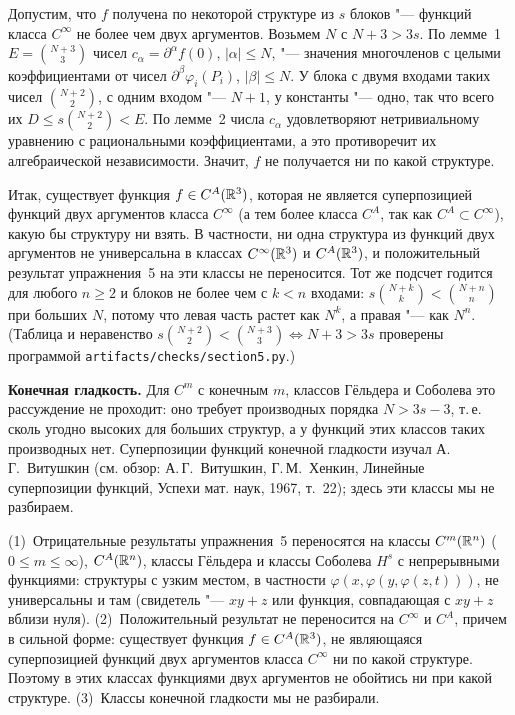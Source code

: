 \begin{solution}[6 (\S\,5)]
Допустим, что $f$ получена по некоторой структуре из $s$ блоков "--- функций
класса $C^\infty$ не более чем двух аргументов. Возьмем $N$ с $N+3>3s$. По
лемме~1 $E=\binom{N+3}3$ чисел $c_\alpha=\partial^\alpha f(0)$, $|\alpha|\le N$,
"--- значения многочленов с целыми коэффициентами от чисел
$\partial^\beta\varphi_i(P_i)$, $|\beta|\le N$. У блока с двумя входами таких
чисел $\binom{N+2}2$, с одним входом "--- $N+1$, у константы "--- одно, так
что всего их $D\le s\binom{N+2}2<E$. По лемме~2 числа $c_\alpha$
удовлетворяют нетривиальному уравнению с рациональными коэффициентами, а это
противоречит их алгебраической независимости. Значит, $f$ не получается
ни по какой структуре.

Итак, существует функция $f\in C^A(\mathbb R^3)$, которая не является суперпозицией
функций двух аргументов класса $C^\infty$ (а тем более класса $C^A$, так как
$C^A\subset C^\infty$), какую бы структуру ни взять. В частности, ни одна
структура из функций двух аргументов не универсальна в классах
$C^\infty(\mathbb R^3)$ и $C^A(\mathbb R^3)$, и положительный результат упражнения~5 на эти
классы не переносится. Тот же подсчет годится для любого $n\ge2$ и блоков
не более чем с $k<n$ входами: $s\binom{N+k}k<\binom{N+n}n$ при больших $N$,
потому что левая часть растет как $N^k$, а правая "--- как $N^n$.
(Таблица и неравенство $s\binom{N+2}2<\binom{N+3}3\iff N+3>3s$ проверены
программой \texttt{artifacts/checks/section5.py}.)

\textbf{Конечная гладкость.} Для $C^m$ с конечным $m$, классов Гёльдера
и Соболева это рассуждение не проходит: оно требует производных порядка
$N>3s-3$, т.\,е. сколь угодно высоких для больших структур, а у функций этих
классов таких производных нет. Суперпозиции функций конечной гладкости
изучал А.\,Г.~Витушкин (см. обзор: А.\,Г.~Витушкин, Г.\,М.~Хенкин, Линейные
суперпозиции функций, Успехи мат. наук, 1967, т.~22); здесь эти классы мы
не разбираем.

\answer (1)~Отрицательные результаты упражнения~5 переносятся на классы
$C^m(\mathbb R^n)$ ($0\le m\le\infty$), $C^A(\mathbb R^n)$, классы Гёльдера и классы Соболева
$H^s$ с непрерывными функциями: структуры с узким местом, в частности
$\varphi(x,\varphi(y,\varphi(z,t)))$, не универсальны и там (свидетель "---
$xy+z$ или функция, совпадающая с $xy+z$ вблизи нуля). (2)~Положительный
результат не переносится на $C^\infty$ и $C^A$, причем в сильной форме:
существует функция $f\in C^A(\mathbb R^3)$, не являющаяся суперпозицией функций
двух аргументов класса $C^\infty$ ни по какой структуре. Поэтому в этих
классах функциями двух аргументов не обойтись ни при какой структуре.
(3)~Классы конечной гладкости мы не разбирали.
\end{solution}
